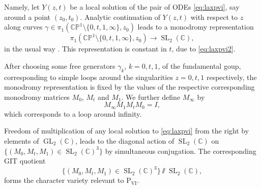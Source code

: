 \documentclass[a4paper,reqno]{amsart}
\numberwithin{equation}{section}
\newcommand\Psix{\textrm{P}_{\textrm{VI}}}
\DeclareMathOperator{\SL}{SL}
\numberwithin{equation}{section}
\begin{document}
Namely, let $Y(z,t)$ be a local solution of the pair of ODEs \eqref{eq:laxpvi}, say around a point $(z_0,t_0)$. Analytic continuation of $Y(z,t)$ with respect to $z$ along curves $\gamma\in\pi_1(\mathbb{CP}^1\setminus\{0,t,1,\infty\},z_0)$ leads to a monodromy representation
\begin{equation*}
    \pi_1(\mathbb{CP}^1\setminus\{0,t,1,\infty\},z_0)\rightarrow \SL_2(\mathbb{C}),
\end{equation*}
in the usual way \cite{fokas}. This representation is constant in $t$, due to \eqref{eq:laxpvi2}.

After choosing some free generators $\gamma_k$, $k=0,t,1$, of the fundamental goup, corresponding to simple loops around the singularities $z=0,t,1$ respectively, the monodromy representation is fixed by the values of the respective corresponding monodromy matrices $M_0$, $M_t$ and $M_1$. We further define $M_\infty$ by
  \begin{equation*}
        M_\infty M_1M_tM_0=I,
    \end{equation*}
which corresponds to a loop around infinity.

Freedom of multiplication of any local solution to \eqref{eq:laxpvi} from the right by elements of $\operatorname{GL}_2(\mathbb{C})$, leads to the diagonal action of $\operatorname{SL}_2(\mathbb{C})$ on $\{(M_0,M_t,M_1)\in \SL_2(\mathbb{C})^3\}$ by simultaneous conjugation. The corresponding GIT quotient
\begin{equation*}
\{(M_0,M_t,M_1)\in \SL_2(\mathbb{C})^3\}\sslash\SL_2(\mathbb{C}),
\end{equation*}
forms the character variety relevant to $\Psix$.
\end{document}
